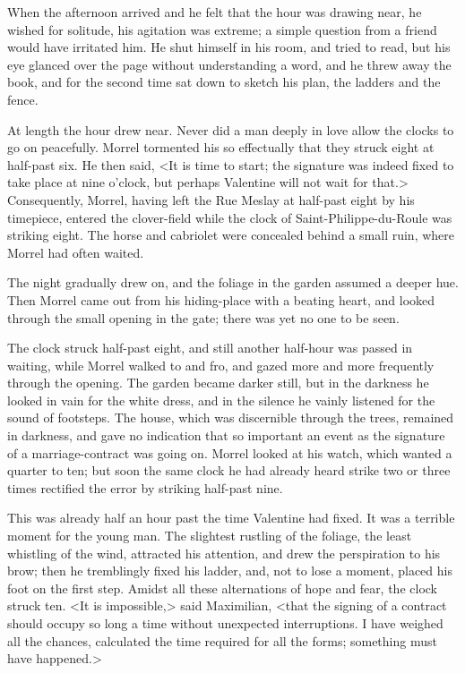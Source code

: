  When the afternoon arrived and he felt that the hour was drawing near, he wished for solitude, his agitation was extreme; a simple question from a friend would have irritated him. He shut himself in his room, and tried to read, but his eye glanced over the page without understanding a word, and he threw away the book, and for the second time sat down to sketch his plan, the ladders and the fence. 

 At length the hour drew near. Never did a man deeply in love allow the clocks to go on peacefully. Morrel tormented his so effectually that they struck eight at half-past six. He then said, <It is time to start; the signature was indeed fixed to take place at nine o'clock, but perhaps Valentine will not wait for that.> Consequently, Morrel, having left the Rue Meslay at half-past eight by his timepiece, entered the clover-field while the clock of Saint-Philippe-du-Roule was striking eight. The horse and cabriolet were concealed behind a small ruin, where Morrel had often waited. 

 The night gradually drew on, and the foliage in the garden assumed a deeper hue. Then Morrel came out from his hiding-place with a beating heart, and looked through the small opening in the gate; there was yet no one to be seen. 

 The clock struck half-past eight, and still another half-hour was passed in waiting, while Morrel walked to and fro, and gazed more and more frequently through the opening. The garden became darker still, but in the darkness he looked in vain for the white dress, and in the silence he vainly listened for the sound of footsteps. The house, which was discernible through the trees, remained in darkness, and gave no indication that so important an event as the signature of a marriage-contract was going on. Morrel looked at his watch, which wanted a quarter to ten; but soon the same clock he had already heard strike two or three times rectified the error by striking half-past nine. 

 This was already half an hour past the time Valentine had fixed. It was a terrible moment for the young man. The slightest rustling of the foliage, the least whistling of the wind, attracted his attention, and drew the perspiration to his brow; then he tremblingly fixed his ladder, and, not to lose a moment, placed his foot on the first step. Amidst all these alternations of hope and fear, the clock struck ten. <It is impossible,> said Maximilian, <that the signing of a contract should occupy so long a time without unexpected interruptions. I have weighed all the chances, calculated the time required for all the forms; something must have happened.> 

